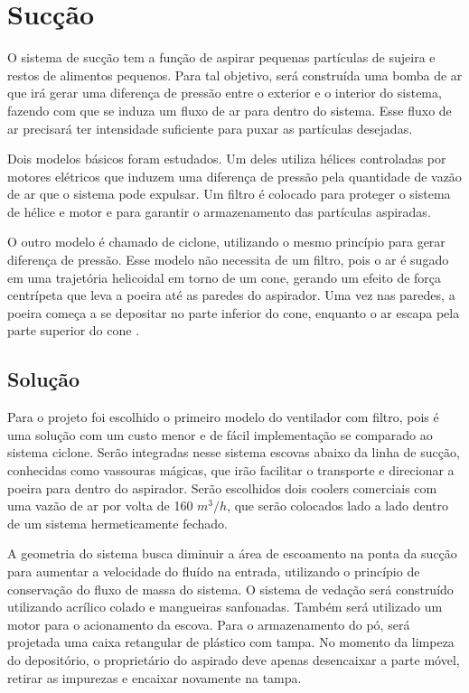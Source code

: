 \section{Sucção} %
\label{sub:aspirador}
	
	O sistema de sucção tem a função de aspirar pequenas partículas de sujeira e restos de alimentos pequenos. Para tal objetivo, será construída uma bomba de ar que irá gerar uma diferença de pressão entre o exterior e o interior do sistema, fazendo com que se induza um fluxo de ar para dentro do sistema. Esse fluxo de ar precisará ter intensidade suficiente para puxar as partículas desejadas. 

	Dois modelos básicos foram estudados. Um deles utiliza hélices controladas por motores elétricos que induzem uma diferença de pressão pela quantidade de vazão de ar que o sistema pode expulsar.  Um filtro é colocado para proteger o sistema de hélice e motor e para garantir o armazenamento das partículas aspiradas.

	O outro modelo é chamado de ciclone, utilizando o mesmo princípio para gerar diferença de pressão. Esse modelo não necessita de um filtro, pois o ar é sugado em uma trajetória helicoidal em torno de um cone, gerando um efeito de força centrípeta que leva a poeira até as paredes do aspirador. Uma vez nas paredes, a poeira começa a se depositar no parte inferior do cone, enquanto o ar escapa pela parte superior do cone \cite{layton}.

	\subsection{Solução} %
	\label{sub:solução}
		
		Para o projeto foi escolhido o primeiro modelo do ventilador com filtro, pois é uma solução com um custo menor e de fácil implementação se comparado ao sistema ciclone. Serão integradas nesse sistema escovas abaixo da linha de sucção, conhecidas como vassouras mágicas, que irão facilitar o transporte e direcionar a poeira para dentro do aspirador. Serão escolhidos dois coolers comerciais com uma vazão de ar por volta de 160 $m^3/h$, que serão colocados lado a lado dentro de um sistema hermeticamente fechado. 

		A geometria do sistema busca diminuir a área de escoamento na ponta da sucção para aumentar a velocidade do fluído na entrada, utilizando o princípio de conservação do fluxo de massa do sistema. O sistema de vedação será construído utilizando acrílico colado e mangueiras sanfonadas. Também será utilizado um motor para o acionamento da escova. Para o armazenamento do pó, será projetada uma caixa retangular de plástico com tampa. No momento da limpeza do depositório, o proprietário do aspirado deve apenas desencaixar a parte móvel, retirar as impurezas e encaixar novamente na tampa.

